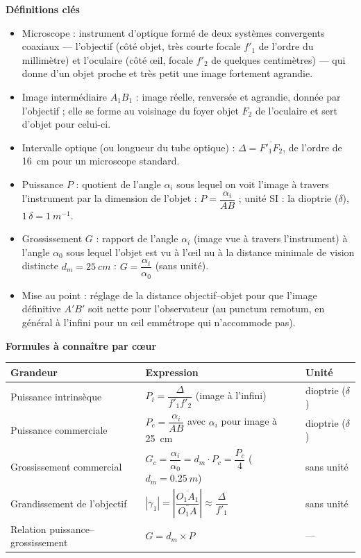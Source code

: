 \documentclass[11pt]{article}
\newcommand{\cle}[1]{{\popxbold\color{popdark}#1}}
\begin{document}
\begin{aretenir}
\textbf{D\'efinitions cl\'es}
\begin{itemize}
  \item \cle{Microscope} : instrument d'optique form\'e de deux syst\`emes convergents coaxiaux --- l'\cle{objectif} (c\^ot\'e objet, tr\`es courte focale $f'_1$ de l'ordre du millim\`etre) et l'\cle{oculaire} (c\^ot\'e \oe il, focale $f'_2$ de quelques centim\`etres) --- qui donne d'un objet proche et tr\`es petit une image fortement agrandie.
  \item \cle{Image interm\'ediaire} $A_1B_1$ : image r\'eelle, renvers\'ee et agrandie, donn\'ee par l'objectif ; elle se forme au voisinage du foyer objet $F_2$ de l'oculaire et sert d'objet pour celui-ci.
  \item \cle{Intervalle optique} (ou longueur du tube optique) : $\Delta = \overline{F'_1F_2}$, de l'ordre de \SI{16}{cm} pour un microscope standard.
  \item \cle{Puissance} $P$ : quotient de l'angle $\alpha_i$ sous lequel on voit l'image \`a travers l'instrument par la dimension de l'objet : $P = \dfrac{\alpha_i}{AB}$ ; unit\'e SI : la \cle{dioptrie} ($\delta$), $1\,\delta = \SI{1}{m^{-1}}$.
  \item \cle{Grossissement} $G$ : rapport de l'angle $\alpha_i$ (image vue \`a travers l'instrument) \`a l'angle $\alpha_0$ sous lequel l'objet est vu \`a l'\oe il nu \`a la distance minimale de vision distincte $d_m = \SI{25}{cm}$ : $G = \dfrac{\alpha_i}{\alpha_0}$ (sans unit\'e).
  \item \cle{Mise au point} : r\'eglage de la distance objectif--objet pour que l'image d\'efinitive $A'B'$ soit nette pour l'observateur (au punctum remotum, en g\'en\'eral \`a l'infini pour un \oe il emm\'etrope qui n'accommode pas).
\end{itemize}

\textbf{Formules \`a conna\^itre par c\oe ur}
\begin{center}
\begin{tabularx}{\linewidth}{|l|X|l|}
\hline
\rowcolor{popblueL} \textbf{Grandeur} & \textbf{Expression} & \textbf{Unit\'e} \\
\hline
Puissance intrins\`eque & $P_i = \dfrac{\Delta}{f'_1 f'_2}$ (image \`a l'infini) & dioptrie ($\delta$) \\
\hline
Puissance commerciale & $P_c = \dfrac{\alpha_i}{AB}$ avec $\alpha_i$ pour image \`a \SI{25}{cm} & dioptrie ($\delta$) \\
\hline
Grossissement commercial & $G_c = \dfrac{\alpha_i}{\alpha_0} = d_m \cdot P_c = \dfrac{P_c}{4}$ ($d_m = \SI{0,25}{m}$) & sans unit\'e \\
\hline
Grandissement de l'objectif & $|\gamma_1| = \left|\dfrac{\overline{O_1A_1}}{\overline{O_1A}}\right| \approx \dfrac{\Delta}{f'_1}$ & sans unit\'e \\
\hline
Relation puissance--grossissement & $G = d_m \times P$ & --- \\
\hline
\end{tabularx}
\end{center}


\end{aretenir}
\end{document}
